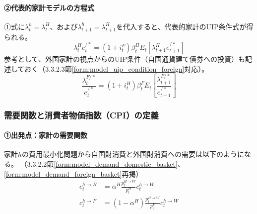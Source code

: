 \paragraph{②代表的家計モデルの方程式}\label{sec:model_final_equations_utility_uip_ra_eq}
①式に\(\lambda_t^h=\lambda_t^H\)、および\(\lambda_{t+1}^h=\lambda_{t+1}^H\)を代入すると、代表的家計のUIP条件式が得られる。
\begin{equation}
\lambda_t^He_t^{/*}=(1+i_t^F)\beta_t^HE_t[\lambda_{t+1}^He_{t+1}^{/*}]
\label{form:model_final_equations_utility_uip_h}
\end{equation}
参考として、外国家計の視点からのUIP条件（自国通貨建て債券への投資）も記述しておく（3.3.2.3節\eqref{form:model_uip_condition_foreign}対応）。
\begin{equation}
\frac{\lambda_t^{F/*}}{e_t^{/*}}=(1+i_t^H)\beta_t^FE_t\left[\frac{\lambda_{t+1}^{F/*}}{e_{t+1}^{/*}}\right]
\label{form:model_final_equations_utility_uip_f}
\end{equation}

\subsubsection{需要関数と消費者物価指数（CPI）の定義}
\label{sec:model_final_equations_utility_demand}
\paragraph{①出発点：家計の需要関数}\label{sec:model_final_equations_utility_demand_origin}
家計\(h\)の費用最小化問題から自国財消費と外国財消費への需要は以下のようになる。
（3.3.2.2節\eqref{form:model_demand_domestic_basket}、\eqref{form:model_demand_foreign_basket}再掲）
\begin{align}
c_t^{h\to H}&=\alpha^H\frac{p_t^{H\to W}}{p_t^H}c_t^{h\to W} \label{form:model_final_equations_utility_demand_domestic_restated} \\
c_t^{h\to F}&=(1-\alpha^H)\frac{p_t^{H\to W}}{p_t^F}c_t^{h\to W} \label{form:model_final_equations_utility_demand_foreign_restated}
\end{align}


